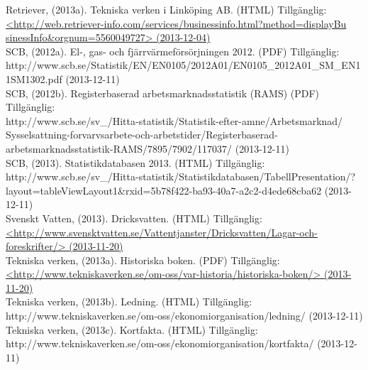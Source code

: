 \documentclass[10pt,a4paper]{article}
\begin{document}
Retriever, (2013a). Tekniska verken i Linköping AB. (HTML) Tillgänglig: \\
\hyperref{http://web.retriever-info.com/services/businessinfo.html?method=displayBusinessInfo\&orgnum=5560049727}{}{}{<http://web.retriever-info.com/services/businessinfo.html?method=displayBu\\sinessInfo\&orgnum=5560049727> (2013-12-04)}\\

SCB, (2012a). El-, gas- och fjärrvärmeförsörjningen 2012. (PDF) Tillgänglig:\\
http://www.scb.se/Statistik/EN/EN0105/2012A01/EN0105\_2012A01\_SM\_EN11SM1302.pdf (2013-12-11)\\

SCB, (2012b). Registerbaserad arbetsmarknadsstatistik (RAMS) (PDF) Tillgänglig:\\
http://www.scb.se/sv\_/Hitta-statistik/Statistik-efter-amne/Arbetsmarknad/ \\Sysselsattning-forvarvsarbete-och-arbetstider/Registerbaserad-arbetsmarknadsstatistik-RAMS/7895/7902/117037/ (2013-12-11)\\

SCB, (2013). Statistikdatabasen 2013. (HTML) Tillgänglig:\\
http://www.scb.se/sv\_/Hitta-statistik/Statistikdatabasen/TabellPresentation/?\\layout=tableViewLayout1\&rxid=5b78f422-ba93-40a7-a2c2-d4ede68cba62 (2013-12-11)\\

Svenskt Vatten, (2013). Dricksvatten. (HTML) Tillgänglig: \\
\hyperref{http://www.svensktvatten.se/Vattentjanster/Dricksvatten/Lagar-och-foreskrifter/}{}{}{<http://www.svensktvatten.se/Vattentjanster/Dricksvatten/Lagar-och-foreskrifter/>
(2013-11-20)} \\

Tekniska verken, (2013a). Historiska boken. (PDF) Tillgänglig: \\
\hyperref{http://www.tekniskaverken.se/om-oss/var-historia/historiska-boken/}{}{}{<http://www.tekniskaverken.se/om-oss/var-historia/historiska-boken/> (2013-11-20)}\\

Tekniska verken, (2013b). Ledning. (HTML) Tillgänglig: \\
http://www.tekniskaverken.se/om-oss/ekonomiorganisation/ledning/ (2013-12-11)\\

Tekniska verken, (2013c). Kortfakta. (HTML) Tillgänglig: \\
http://www.tekniskaverken.se/om-oss/ekonomiorganisation/kortfakta/ (2013-12-11)\\
\end{document}
